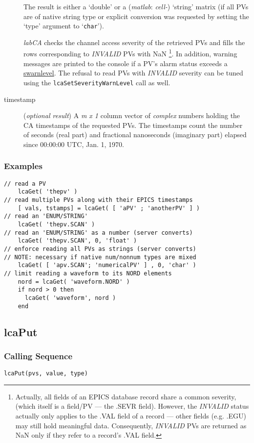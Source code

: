 \documentclass{article}
\newcommand{\sca}{\ita{labCA}}
\newcommand{\matlab}{\ita{matlab}}
\newcommand{\com}[1]{{\tt #1}}
\newcommand{\NAN}{\mbox{NaN}}
\newcommand{\pbrk}{\pagebreak[3]}
\newcommand{\ita}[1]{\emph{#1}}
\newcommand{\mxl}{$m\times 1$}
\renewcommand{\mxl}{\ita{m x 1}}
\renewcommand{\pbrk}{}
\begin{document}
\begin{description}
The result is either a `double' or a (\matlab: \ita{cell-}) `string'
matrix (if all PVs are of native string type or explicit conversion
was requested by setting the `type' argument to `\com{char}').

\sca{} checks the channel access severity of the retrieved PVs and
fills the rows corresponding to \ita{INVALID} PVs with \NAN%
\footnote{
Actually, all fields of an EPICS database record share a common
severity, (which itself is a field/PV --- the .SEVR field). However,
the \ita{INVALID} status actually only applies to the .VAL field
of a record --- other fields (e.g. .EGU) may still hold meaningful data.
Consequently, \ita{INVALID} PVs are returned as \NAN{} only if
they refer to a record's .VAL field.
}. In addition, warning
messages are printed to the console if a PV's alarm status exceeds
a \hyperref{configurable threshold}{configurable threshold (see }{ )}{swarnlevel}.
The refusal to read PVs with \ita{INVALID} severity can be tuned using
the \com{lcaSetSeverityWarnLevel} call as well.
%
%
\item[timestamp] (\ita{optional result}) A \mxl{}
column vector of \ita{complex} numbers holding the CA timestamps of
the requested PVs. The timestamps count the number of seconds (real part)
and fractional nanoseconds (imaginary part) elapsed since
00:00:00 UTC, Jan. 1, 1970.
\end{description}
\subsubsection{Examples}
\begin{verbatim}
// read a PV
    lcaGet( 'thepv' )
// read multiple PVs along with their EPICS timestamps
    [ vals, tstamps] = lcaGet( [ 'aPV' ; 'anotherPV' ] )
// read an 'ENUM/STRING'
    lcaGet( 'thepv.SCAN' )
// read an 'ENUM/STRING' as a number (server converts)
    lcaGet( 'thepv.SCAN', 0, 'float' )
// enforce reading all PVs as strings (server converts)
// NOTE: necessary if native num/nonnum types are mixed
    lcaGet( [ 'apv.SCAN'; 'numericalPV' ] , 0, 'char' )
// limit reading a waveform to its NORD elements
    nord = lcaGet( 'waveform.NORD' )
	if nord > 0 then
      lcaGet( 'waveform', nord )
	end
\end{verbatim}

\pbrk
\subsection{lcaPut}
\label{lcaput}
\subsubsection{Calling Sequence}
\begin{verbatim}
lcaPut(pvs, value, type)
\end{verbatim}
\end{document}
